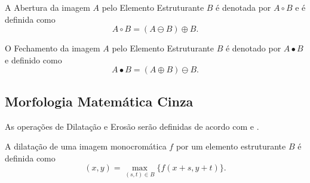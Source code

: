 \begin{define}
	A Abertura da imagem $A$ pelo Elemento Estruturante $B$ é denotada por $A \circ B$ e é definida como 
	\begin{equation}
		A \circ B = (A \ominus B) \oplus B.
	\end{equation}
\end{define}

\begin{define}
	O Fechamento da imagem $A$ pelo Elemento Estruturante $B$ é denotado por $A \bullet B$ e definido como
	\begin{equation}
		A \bullet B = (A \oplus B) \ominus B.
	\end{equation}
\end{define}


\subsection{Morfologia Matemática Cinza}

As operações de Dilatação e Erosão serão definidas de acordo com \cite{gonzalezprocessamento} e \cite{pedrinischwartz}.

\begin{define}
	A dilatação de uma imagem monocromática $f$ por um elemento estruturante $B$ é definida como
	\begin{equation}
		[f \oplus B](x,y) = \max_{(s,t) \in B}\{f(x+s,y+t)\}.
	\end{equation}
\end{define}

